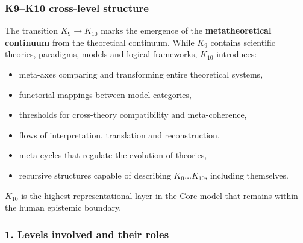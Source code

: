 
\subsubsection{K9–K10 cross-level structure}
\label{sec:crossk-k9-k10}

The transition $K_9 \rightarrow K_{10}$ marks the emergence of the
\textbf{metatheoretical continuum} from the theoretical continuum.
While $K_9$ contains scientific theories, paradigms, models and logical
frameworks, $K_{10}$ introduces:
\begin{itemize}
  \item meta-axes comparing and transforming entire theoretical systems,
  \item functorial mappings between model-categories,
  \item thresholds for cross-theory compatibility and meta-coherence,
  \item flows of interpretation, translation and reconstruction,
  \item meta-cycles that regulate the evolution of theories,
  \item recursive structures capable of describing $K_0 \dots K_{10}$,
        including themselves.
\end{itemize}

$K_{10}$ is the highest representational layer in the Core model that remains
within the human epistemic boundary.

\subsubsection{1. Levels involved and their roles}

